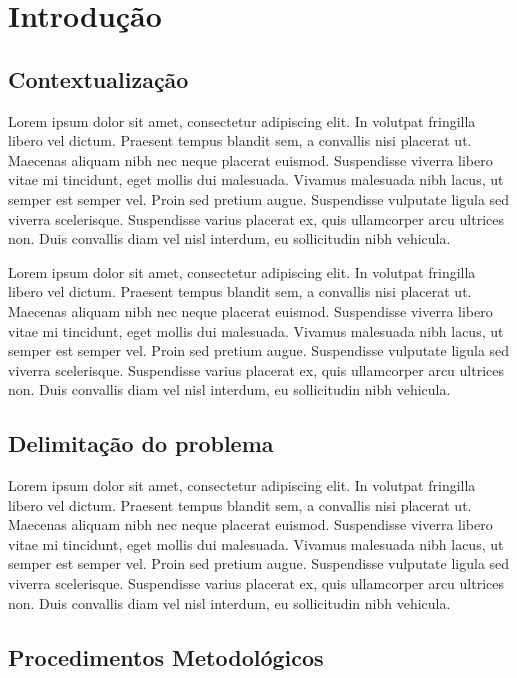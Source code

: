 \chapter{Introdução}
 
\section{Contextualização}

Lorem ipsum dolor sit amet, consectetur adipiscing elit. In volutpat fringilla libero vel dictum. Praesent tempus blandit sem, a convallis nisi placerat ut. Maecenas aliquam nibh nec neque placerat euismod. Suspendisse viverra libero vitae mi tincidunt, eget mollis dui malesuada. Vivamus malesuada nibh lacus, ut semper est semper vel. Proin sed pretium augue. Suspendisse vulputate ligula sed viverra scelerisque. Suspendisse varius placerat ex, quis ullamcorper arcu ultrices non. Duis convallis diam vel nisl interdum, eu sollicitudin nibh vehicula.

Lorem ipsum dolor sit amet, consectetur adipiscing elit. In volutpat fringilla libero vel dictum. Praesent tempus blandit sem, a convallis nisi placerat ut. Maecenas aliquam nibh nec neque placerat euismod. Suspendisse viverra libero vitae mi tincidunt, eget mollis dui malesuada. Vivamus malesuada nibh lacus, ut semper est semper vel. Proin sed pretium augue. Suspendisse vulputate ligula sed viverra scelerisque. Suspendisse varius placerat ex, quis ullamcorper arcu ultrices non. Duis convallis diam vel nisl interdum, eu sollicitudin nibh vehicula.

\section{Delimitação do problema}

Lorem ipsum dolor sit amet, consectetur adipiscing elit. In volutpat fringilla libero vel dictum. Praesent tempus blandit sem, a convallis nisi placerat ut. Maecenas aliquam nibh nec neque placerat euismod. Suspendisse viverra libero vitae mi tincidunt, eget mollis dui malesuada. Vivamus malesuada nibh lacus, ut semper est semper vel. Proin sed pretium augue. Suspendisse vulputate ligula sed viverra scelerisque. Suspendisse varius placerat ex, quis ullamcorper arcu ultrices non. Duis convallis diam vel nisl interdum, eu sollicitudin nibh vehicula.




\section{Procedimentos Metodológicos}

